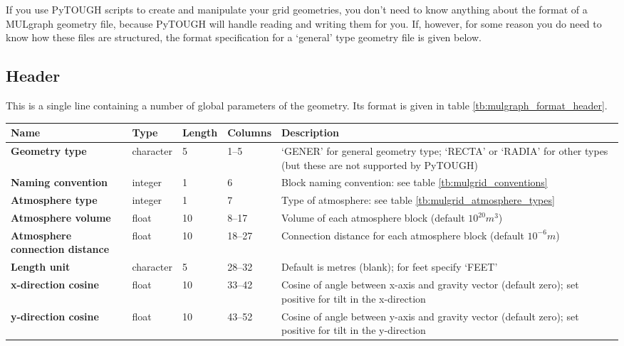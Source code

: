 If you use PyTOUGH scripts to create and manipulate your grid geometries, you don't need to know anything about the format of a MULgraph geometry file, because PyTOUGH will handle reading and writing them for you. If, however, for some reason you do need to know how these files are structured, the format specification for a `general' type geometry file is given below.

\subsection{Header}

This is a single line containing a number of global parameters of the geometry. Its format is given in table \ref{tb:mulgraph_format_header}.

\begin{table}
  \begin{center}
    \begin{tabular}{|p{20mm}|l|l|l|p{50mm}|}
      \hline
      \textbf{Name} & \textbf{Type} & \textbf{Length} & \textbf{Columns} & \textbf{Description}\\
      \hline
      \textbf{Geometry type} & character & 5 & 1--5 & `GENER' for general geometry type; `RECTA' or `RADIA' for other types (but these are not supported by PyTOUGH)\\
      \hline
      \textbf{Naming convention} & integer & 1 & 6 & Block naming convention: see table \ref{tb:mulgrid_conventions}\\
      \hline
      \textbf{Atmosphere type} & integer & 1 & 7 & Type of atmosphere: see table \ref{tb:mulgrid_atmosphere_types}\\
      \hline
      \textbf{Atmosphere volume} & float & 10 & 8--17 & Volume of each atmosphere block (default $10^{20} m^3$)\\
      \hline
      \textbf{Atmosphere connection distance} & float & 10 & 18--27 & Connection distance for each atmosphere block (default $10^{-6} m$) \\
      \hline
      \textbf{Length unit} & character & 5 & 28--32 & Default is metres (blank); for feet specify `FEET'\\
      \hline
      \textbf{x-direction cosine} & float & 10 & 33--42 & Cosine of angle between x-axis and gravity vector (default zero); set positive for tilt in the x-direction\\
      \hline
      \textbf{y-direction cosine} & float & 10 & 43--52 & Cosine of angle between y-axis and gravity vector (default zero); set positive for tilt in the y-direction\\

\end{tabular}
\end{center}
\end{table}
